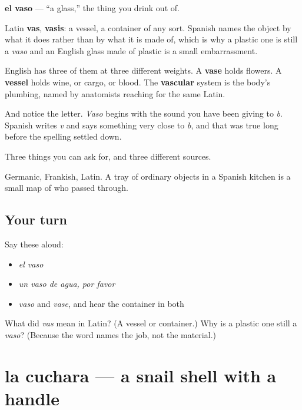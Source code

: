 \begin{cousinweb}
\textbf{el vaso} — \textquotedblleft{}a glass,\textquotedblright{} the thing you drink out of.

Latin \textbf{vas}, \textbf{vasis}: a vessel, a container of any sort. Spanish names the object by what it does rather than by what it is made of, which is why a plastic one is still a \emph{vaso} and an English glass made of plastic is a small embarrassment.

English has three of them at three different weights. A \textbf{vase} holds flowers. A \textbf{vessel} holds wine, or cargo, or blood. The \textbf{vascular} system is the body's plumbing, named by anatomists reaching for the same Latin.

And notice the letter. \emph{Vaso} begins with the sound you have been giving to \emph{b}. Spanish writes \emph{v} and says something very close to \emph{b}, and that was true long before the spelling settled down.
\end{cousinweb}

\begin{grammarlens}[title={What you've built}]
Three things you can ask for, and three different sources.

Germanic, Frankish, Latin. A tray of ordinary objects in a Spanish kitchen is a small map of who passed through.
\end{grammarlens}

\subsection*{Your turn}
Say these aloud:

\begin{itemize}
\raggedright
  \item \emph{el vaso}
  \item \emph{un vaso de agua, por favor}
  \item \emph{vaso} and \emph{vase}, and hear the container in both
\end{itemize}

\begin{tcolorbox}[breakable,colback=teal!4,colframe=teal!35!black,title={Before you move on}]
What did \emph{vas} mean in Latin? (A vessel or container.) Why is a plastic one still a \emph{vaso}? (Because the word names the job, not the material.)
\end{tcolorbox}
\section[la cuchara]{la cuchara — a snail shell with a handle}

